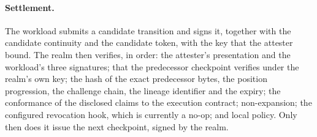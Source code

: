 \documentclass[10pt,twocolumn]{article}
\begin{document}
\paragraph{Settlement.}
The workload submits a candidate transition and signs it, together with the
candidate continuity and the candidate token, with the key that the attester
bound. The realm then verifies, in order: the attester's presentation and the
workload's three signatures; that the predecessor checkpoint verifies under the
realm's own key; the hash of the exact predecessor bytes, the position
progression, the challenge chain, the lineage identifier and the expiry; the
conformance of the disclosed claims to the execution contract; non-expansion;
the configured revocation hook, which is currently a no-op; and local policy.
Only then does it issue the next checkpoint, signed by the realm.
\end{document}

